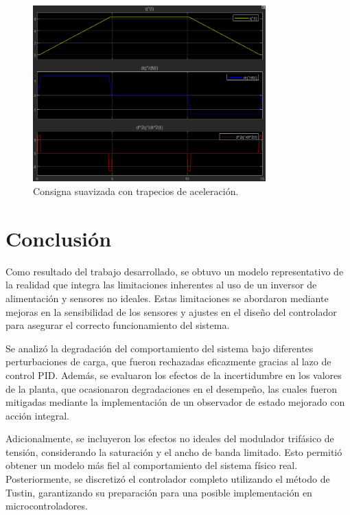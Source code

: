 \documentclass{article}
\begin{document}
\begin{figure}[H]
    \centering
    \includegraphics[width=0.8\textwidth]{Imagenes/AceleracionTrapezoidal.png}
    \caption{Consigna suavizada con trapecios de aceleración.}
    \label{fig:AceleracionTrapezoidal}
\end{figure}



\section{Conclusión}

Como resultado del trabajo desarrollado, se obtuvo un modelo representativo de la realidad que integra las limitaciones inherentes al uso de un inversor de alimentación y sensores no ideales. Estas limitaciones se abordaron mediante mejoras en la sensibilidad de los sensores y ajustes en el diseño del controlador para asegurar el correcto funcionamiento del sistema.

Se analizó la degradación del comportamiento del sistema bajo diferentes perturbaciones de carga, que fueron rechazadas eficazmente gracias al lazo de control PID. Además, se evaluaron los efectos de la incertidumbre en los valores de la planta, que ocasionaron degradaciones en el desempeño, las cuales fueron mitigadas mediante la implementación de un observador de estado mejorado con acción integral.

Adicionalmente, se incluyeron los efectos no ideales del modulador trifásico de tensión, considerando la saturación y el ancho de banda limitado. Esto permitió obtener un modelo más fiel al comportamiento del sistema físico real. Posteriormente, se discretizó el controlador completo utilizando el método de Tustin, garantizando su preparación para una posible implementación en microcontroladores.
\end{document}
